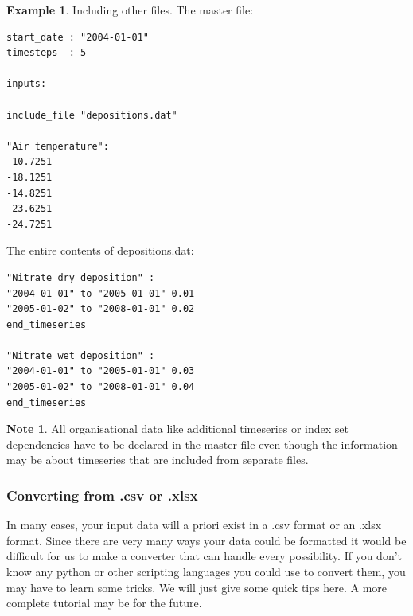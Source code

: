 \documentclass[11pt]{article}
\theoremstyle{definition}
\newtheorem{mynote}{Note}
\newenvironment{note}%
  {\begin{lrbox}{\notebox}%
   \begin{minipage}{\dimexpr\linewidth-2\fboxsep}
   \begin{mynote}}%
  {\end{mynote}%
   \end{minipage}%
   \end{lrbox}%
   \begin{trivlist}
     \item[]\colorbox{silver}{\usebox\notebox}
   \end{trivlist}}
\newtheorem{myexample}{Example}
\newenvironment{example}%
  {\begin{lrbox}{\examplebox}%
   \begin{minipage}{\dimexpr\linewidth-2\fboxsep}
   \begin{myexample}}%
  {\end{myexample}%
   \end{minipage}%
   \end{lrbox}%
   \begin{trivlist}
     \item[]\colorbox{silver}{\usebox\examplebox}
   \end{trivlist}}
\begin{document}
\begin{example}
Including other files. The master file:
\begin{lstlisting}
start_date : "2004-01-01"
timesteps  : 5

inputs:

include_file "depositions.dat"

"Air temperature":
-10.7251
-18.1251
-14.8251
-23.6251
-24.7251
\end{lstlisting}
The entire contents of depositions.dat:
\begin{lstlisting}
"Nitrate dry deposition" :
"2004-01-01" to "2005-01-01" 0.01
"2005-01-02" to "2008-01-01" 0.02
end_timeseries

"Nitrate wet deposition" :
"2004-01-01" to "2005-01-01" 0.03
"2005-01-02" to "2008-01-01" 0.04
end_timeseries
\end{lstlisting}
\end{example}

\begin{note}
All organisational data like additional timeseries or index set dependencies have to be declared in the master file even though the information may be about timeseries that are included from separate files.
\end{note}


\subsubsection{Converting from .csv or .xlsx}
In many cases, your input data will a priori exist in a .csv format or an .xlsx format. Since there are very many ways your data could be formatted it would be difficult for us to make a converter that can handle every possibility. If you don't know any python or other scripting languages you could use to convert them, you may have to learn some tricks. We will just give some quick tips here. A more complete tutorial may be for the future.
\end{document}

